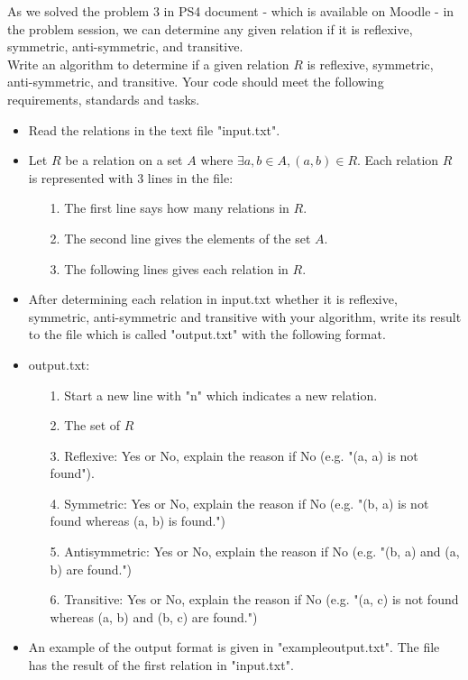 \documentclass[a4 paper]{article}
\numberwithin{equation}{section}
\newcommand{\0}{\mathbf{0}}
\begin{document}
As we solved the problem 3 in PS4 document - which is available on Moodle - in the problem session, we can determine any given relation if it is reflexive, symmetric, anti-symmetric, and transitive.\\

Write an algorithm to determine if a given relation $R$ is reflexive, symmetric, anti-symmetric, and transitive. Your code should meet the following requirements, standards and tasks.

\begin{itemize}
	\item Read the relations in the text file "input.txt".
	\item Let $R$ be a relation on a set $A$ where $\exists a,b \in A, (a,b) \in R$. Each relation $R$ is represented with 3 lines in the file:
	\begin{itemize}
		\item [1.] The first line says how many relations in $R$.
		\item[2.] The second line gives the elements of the set $A$.
		\item[3.] The following lines gives each relation in $R$.
	\end{itemize}
	\item After determining each relation in input.txt whether it is reflexive, symmetric, anti-symmetric and transitive with your algorithm, write its result to the file which is called "output.txt" with the following format.
	\item output.txt:
	\begin{itemize}
		\item[1.] Start a new line with "n" which indicates a new relation.
		\item[2.] The set of $R$
		\item[3.] Reflexive: Yes or No, explain the reason if No (e.g. "(a, a) is not found").
		\item[4.] Symmetric: Yes or No, explain the reason if No (e.g. "(b, a) is not found whereas (a, b) is found.")
		\item[5.] Antisymmetric: Yes or No, explain the reason if No (e.g. "(b, a) and (a, b) are found.")
		\item[6.] Transitive: Yes or No, explain the reason if No (e.g. "(a, c) is not found whereas (a, b) and (b, c) are found.")
	\end{itemize}
	\item An example of the output format is given in "exampleoutput.txt". The file has the result of the first relation in "input.txt".

\end{itemize}
\end{document}
